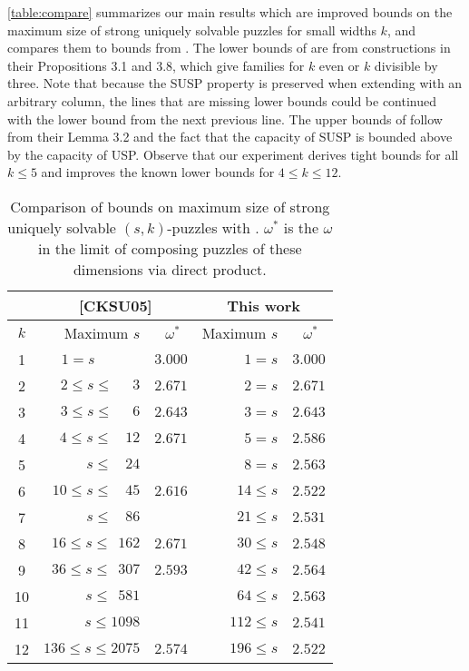 \documentclass[11pt]{article}
\begin{document}
\autoref{table:compare} summarizes our main results which are improved
bounds on the maximum size of strong uniquely solvable puzzles for
small widths $k$, and compares them to bounds from \cite{cksu05}.  The
lower bounds of \cite{cksu05} are from constructions in their
Propositions 3.1 and 3.8, which give families for $k$ even or $k$
divisible by three.  Note that because the SUSP property is preserved
when extending with an arbitrary column, the lines that are missing
lower bounds could be continued with the lower bound from the next
previous line.  The upper bounds of \cite{cksu05} follow from their
Lemma 3.2 and the fact that the capacity of SUSP is bounded above by
the capacity of USP.  Observe that our experiment derives tight bounds
for all $k \le 5$ and improves the known lower bounds for $4 \le k \le
12$.
\begin{table}

  \begin{center}
  \begin{tabular}{|c|r|r|r|r|}
    \hline
    & \multicolumn{2}{|c|}{[CKSU05]} & \multicolumn{2}{|c|}{This work} \\
    \hline
    $k$ & Maximum $s$ & $\omega^*$~ & Maximum $s$ & $\omega^*$~\\
    \hline
    1 & $1 = s \;\,~~~~~~~~~~~~$ & $3.000$ & $1=s$ & $3.000$  \\
    2 & $2 \le s\le ~~~~~~3$ & $2.671$ & $2=s$ & $2.671$ \\
    3 & $3 \le s \le ~~~~~~6$ & $2.643$ & $3=s$ & $2.643$ \\
    4 & $4 \le s\le ~~~~12$ & $2.671$ & $5=s$ & $2.586$ \\
    5 & $ s\le ~~~~24$ &  & $8=s$ & $2.563$  \\
    6 & $10 \le s \le ~~~~45$ & $2.616$ &$14\le s$ & $2.522$\\
    7 & $s\le ~~~~86$ &  & $21\le s$ & $2.531$ \\
    8 & $16 \le s\le ~~162$ & $2.671$ & $30\le s$ & $2.548$ \\
    9 & $36 \le s \le ~~307$ & $2.593$ &$42\le s$ & $2.564$  \\
    10 & $s \le ~~581$ & & $64 \le s$ & $2.563$ \\ 
    11 & $s \le 1098$ &  & $112 \le s$ & $2.541$ \\
    12 & $136 \le s \le 2075$ & $2.574$ & $196 \le s$ & $2.522$ \\
    \hline
  \end{tabular}
  \end{center}
  \caption{Comparison of bounds on maximum size of strong uniquely
    solvable $(s,k)$-puzzles with \cite{cksu05}.  $\omega^*$ is the
    $\omega$ in the limit of composing puzzles of these dimensions via
    direct product.}
  \label{table:compare}
\end{table}
\end{document}
